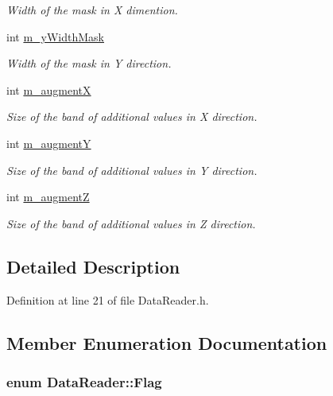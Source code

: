 \begin{DoxyCompactItemize}
\begin{DoxyCompactList}\small\item\em Width of the mask in X dimention. \end{DoxyCompactList}\item 
int \hyperlink{classDataReader_aa381a07a34d528a39ae493aba4d42521}{m\+\_\+y\+Width\+Mask}
\begin{DoxyCompactList}\small\item\em Width of the mask in Y direction. \end{DoxyCompactList}\item 
int \hyperlink{classDataReader_a3857860c363d6127fc8b6b54fd53d81f}{m\+\_\+augmentX}
\begin{DoxyCompactList}\small\item\em Size of the band of additional values in X direction. \end{DoxyCompactList}\item 
int \hyperlink{classDataReader_a139941a6fc5ba0546a1ddb892b2ec958}{m\+\_\+augmentY}
\begin{DoxyCompactList}\small\item\em Size of the band of additional values in Y direction. \end{DoxyCompactList}\item 
int \hyperlink{classDataReader_a71318eba05d2c7dbf8ac6bd804f5d5da}{m\+\_\+augmentZ}
\begin{DoxyCompactList}\small\item\em Size of the band of additional values in Z direction. \end{DoxyCompactList}\end{DoxyCompactItemize}


\subsection{Detailed Description}


Definition at line 21 of file Data\+Reader.\+h.



\subsection{Member Enumeration Documentation}
\subsubsection[{\texorpdfstring{Flag}{Flag}}]{\setlength{\rightskip}{0pt plus 5cm}enum {\bf Data\+Reader\+::\+Flag}\hspace{0.3cm}{\ttfamily [private]}}\hypertarget{classDataReader_a4d7ac2e743b4d00d62ce3ac86dd35f76}{}\label{classDataReader_a4d7ac2e743b4d00d62ce3ac86dd35f76}


